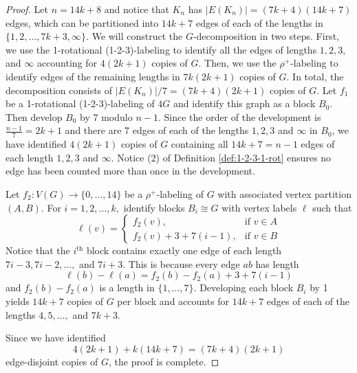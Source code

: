 \begin{proof}
    Let $n=14k+8$ and notice that $K_n$ has $|E(K_n)|=(7k+4)(14k+7)$ edges, which can be partitioned into $14k+7$ edges of each of the lengths in $\{1,2,\dots,7k+3,\infty\}.$  We will construct the $G$-decomposition in two steps. First, we use the 1-rotational (1-2-3)-labeling to identify all the edges of lengths $1,2,3,$ and $\infty$ accounting for $4(2k+1)$ copies of $G$. Then, we use the $\rho^{+}$-labeling to identify edges of the remaining lengths in $7k(2k+1)$ copies of $G$. In total, the decomposition consists of $|E(K_n)|/7=(7k+4)(2k+1)$ copies of $G.$
    Let $f_1$ be a 1-rotational (1-2-3)-labeling of $4G$ and identify this graph as a block $B_0$. Then develop $B_0$ by 7 modulo $n-1$. Since the order of the development is $\frac{n-1}{7}=2k+1$ and there are 7 edges of each of the lengths $1,2,3$ and $\infty$ in $B_0$, we have identified $4(2k+1)$ copies of $G$ containing all $14k+7=n-1$ edges of each length $1,2,3$ and $\infty$. Notice (2) of Definition \ref{def:1-2-3-1-rot} ensures no edge has been counted more than once in the development.

    Let $f_2:V(G) \rightarrow \{0,\dots,14\}$ be a $\rho^{+}$-labeling of $G$ with associated vertex partition $(A,B).$ For $i=1,2,\dots,k,$ identify blocks $B_i \cong G$ with vertex labels $\ell$ such that
    \[
    \ell(v)=
    \begin{cases}
        f_2(v), & \textrm{if } v \in A \\
        f_2(v)+3+7(i-1), & \textrm{if } v \in B
    \end{cases}
    \]
    Notice that the $i^{\textrm{th}}$ block contains exactly one edge of each length $7i-3,7i-2, \dots,$ and $ 7i+3.$ This is because every edge $ab$ has length 
    \[
    \ell(b)-\ell(a)=f_2(b)-f_2(a)+3+7(i-1)
    \]
    and $f_2(b)-f_2(a)$ is a length in $\{1,\dots,7\}.$
    Developing each block $B_i$ by 1 yields $14k+7$ copies of $G$ per block and accounts for $14k+7$ edges of each of the lengths $4,5,\dots,$ and $7k+3$.

    Since we have identified
    \[
    4(2k+1)+k(14k+7)=(7k+4)(2k+1)
    \]
    edge-disjoint copies of $G$, the proof is complete.
\end{proof}

